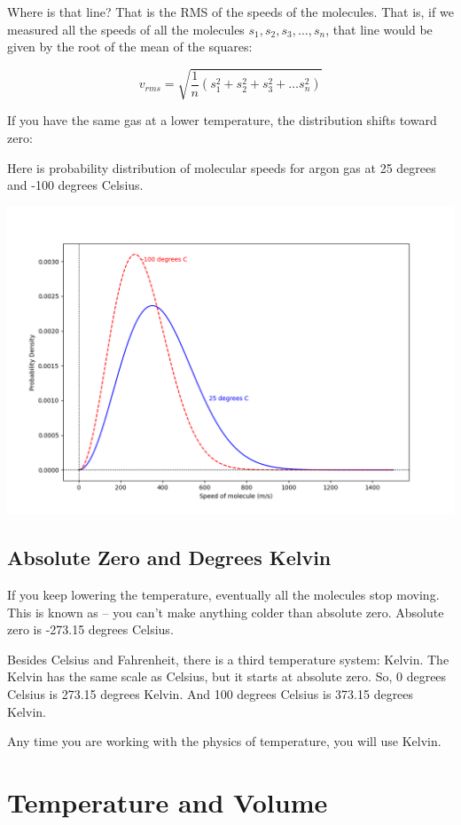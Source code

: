 Where is that line?  That is the RMS of the speeds of the molecules.  That is, if we measured all the speeds of all the molecules  $s_1, s_2, s_3, \ldots, s_n$, that line would be given by the root of the mean of the squares:

$$v_{rms} = \sqrt{\frac{1}{n} \left( s_1^2 + s_2^2 + s_3^2 + \ldots s_n^2 \right)}$$

If you have the same gas at a lower temperature, the distribution shifts toward zero:

Here is probability distribution of molecular speeds for argon gas at 25 degrees and -100 degrees Celsius.

\includegraphics[width=\textwidth]{ar2_plot.png}

\subsection{Absolute Zero and Degrees Kelvin}

If you keep lowering the temperature,  eventually all the molecules stop moving.  This is known as  -- you
 can't make anything colder than absolute zero.   Absolute zero is -273.15 degrees Celsius.
 
Besides Celsius and Fahrenheit, there is a third temperature system: Kelvin.  The Kelvin has the same scale as Celsius, but it starts at absolute zero.   
So,  0 degrees Celsius is 273.15 degrees Kelvin.    And 100 degrees Celsius is 373.15 degrees Kelvin.

Any time you are working with the physics of temperature, you will use Kelvin.

\section{Temperature and Volume}

